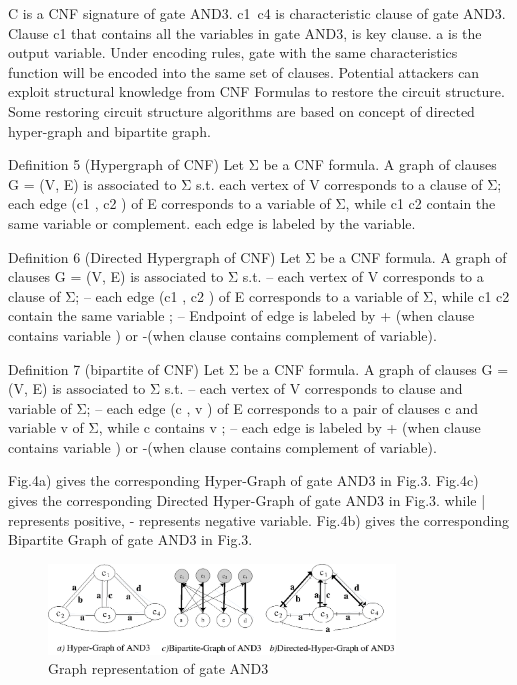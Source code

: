 \documentclass[runningheads,a4paper]{llncs}
\begin{document}
C is a CNF signature of gate AND3. c1~c4 is characteristic clause of gate AND3. Clause c1 that contains all the variables in gate AND3, is key clause. a is the output variable.
\newline Under encoding rules, gate with the same characteristics function will be encoded into the same set of clauses. Potential attackers can exploit structural knowledge from CNF Formulas to restore the circuit structure. Some restoring circuit structure algorithms are based on concept of directed hyper-graph and bipartite graph.	

Definition 5 (Hypergraph of CNF)
\newline Let Σ be a CNF formula. A graph of clauses G = (V, E) is associated to Σ s.t.
\newline each vertex of V corresponds to a clause of  Σ;
\newline each edge (c1 , c2 ) of E corresponds to a variable of Σ, while c1 c2 contain the same variable or complement.
\newline each edge is labeled by the variable.
 
Definition 6 (Directed Hypergraph of CNF)
\newline Let Σ be a CNF formula. A graph of clauses G = (V, E) is associated to Σ s.t.
\newline – each vertex of V corresponds to a clause of Σ;
\newline – each edge (c1 , c2 ) of E corresponds to a variable of Σ, while c1 c2 contain the same variable ;
\newline – Endpoint of edge is labeled by + (when clause contains variable ) or -(when clause contains complement of variable).

Definition 7 (bipartite of CNF)
\newline Let Σ be a CNF formula. A graph of clauses G = (V, E) is associated to Σ s.t.
\newline – each vertex of V corresponds to clause and variable of Σ;
\newline – each edge (c , v ) of E corresponds to a pair of clauses c and variable v of Σ, while c contains v ;
\newline – each edge is labeled by + (when clause contains variable ) or -(when clause contains complement of variable).

Fig.4a) gives the corresponding Hyper-Graph of gate AND3 in Fig.3. 
Fig.4c) gives the corresponding Directed Hyper-Graph of gate AND3 in Fig.3. while | represents positive, - represents negative variable.
Fig.4b) gives the corresponding Bipartite Graph of gate AND3 in Fig.3.
\begin{figure}
\centering
\includegraphics[width=9.2cm]{a4}
\caption{Graph representation of gate AND3}
\label{fig:example}
\end{figure}
\end{document}
